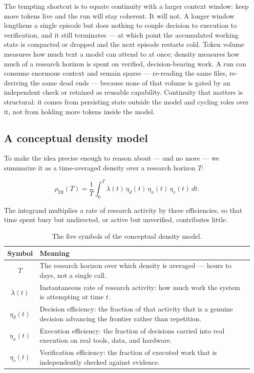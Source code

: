 The tempting shortcut is to equate continuity with a larger context window: keep
more tokens live and the run will stay coherent. It will not. A longer window
lengthens a single episode but does nothing to couple decision to execution to
verification, and it still terminates --- at which point the accumulated working
state is compacted or dropped and the next episode restarts cold. Token volume
measures how much text a model can attend to at once; density measures how much of
a research horizon is spent on verified, decision-bearing work. A run can consume
enormous context and remain sparse --- re-reading the same files, re-deriving the
same dead ends --- because none of that volume is gated by an independent check or
retained as reusable capability. Continuity that matters is structural: it comes
from persisting state outside the model and cycling roles over it, not from
holding more tokens inside the model.

\subsection{A conceptual density model}

To make the idea precise enough to reason about --- and no more --- we summarize
it as a time-averaged density over a research horizon $T$:

\begin{equation}
\rho_{\mathrm{DI}}(T)
= \frac{1}{T}\int_0^T
\lambda(t)\,\eta_d(t)\,\eta_x(t)\,\eta_v(t)\,dt .
\end{equation}

The integrand multiplies a rate of research activity by three efficiencies, so
that time spent busy but undirected, or active but unverified, contributes little.

\begin{table}[H]
\small
\renewcommand{\arraystretch}{1.3}
\begin{tabularx}{\linewidth}{@{}c >{\raggedright\arraybackslash}X@{}}
\toprule
\textbf{Symbol} & \textbf{Meaning} \\
\midrule
$T$ & The research horizon over which density is averaged --- hours to days, not a
single call. \\
\addlinespace
$\lambda(t)$ & Instantaneous rate of research activity: how much work the system is
attempting at time $t$. \\
\addlinespace
$\eta_d(t)$ & Decision efficiency: the fraction of that activity that is a genuine
decision advancing the frontier rather than repetition. \\
\addlinespace
$\eta_x(t)$ & Execution efficiency: the fraction of decisions carried into real
execution on real tools, data, and hardware. \\
\addlinespace
$\eta_v(t)$ & Verification efficiency: the fraction of executed work that is
independently checked against evidence. \\
\bottomrule
\end{tabularx}
\caption{The five symbols of the conceptual density model.}
\label{tab:density}
\end{table}

